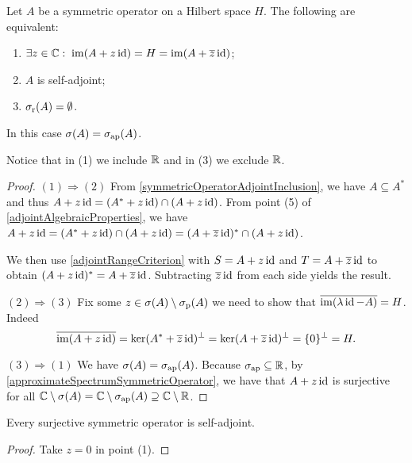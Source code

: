 \begin{proposition} \label{rangeSelfAdjointCriterion}
Let $A$ be a symmetric operator on a Hilbert space $H$. The following are equivalent:
\begin{enumerate}
\item $\exists z \in \mathbb{C}: \; \operatorname{im}(A+z\operatorname{id}) = H = \operatorname{im}(A+\overline{z}\operatorname{id})$;
\item $A$ is self-adjoint;
\item $\sigma_\text{r}(A) = \emptyset$.
\end{enumerate}
In this case $\sigma(A) = \sigma_\text{ap}(A)$.
\end{proposition}
Notice that in (1) we include $\mathbb{R}$ and in (3) we exclude $\mathbb{R}$.
\begin{proof}
$(1) \Rightarrow (2)$ From \ref{symmetricOperatorAdjointInclusion}, we have $A\subseteq A^*$ and thus $A+z\operatorname{id} = (A^* + z\operatorname{id})\cap(A+z\operatorname{id})$. From point (5) of \ref{adjointAlgebraicProperties}, we have $A+z\operatorname{id} = (A^* + z\operatorname{id})\cap(A+z\operatorname{id}) = (A+\overline{z}\operatorname{id})^*\cap (A+z\operatorname{id})$.

We then use \ref{adjointRangeCriterion} with $S = A+z\operatorname{id}$ and $T = A+\overline{z}\operatorname{id}$ to obtain $(A+z\operatorname{id})^* = A+\overline{z}\operatorname{id}$. Subtracting $\overline{z}\operatorname{id}$ from each side yields the result.

$(2) \Rightarrow (3)$ Fix some $z \in \sigma(A) \setminus\sigma_\text{p}(A)$ we need to show that $\overline{\operatorname{im}(\lambda\operatorname{id} - A)} = H$. Indeed
\[ \overline{\operatorname{im}(A+z\operatorname{id})} = \ker(A^* + \overline{z}\operatorname{id})^\perp = \ker(A+\overline{z}\operatorname{id})^\perp = \{0\}^\perp = H. \]

$(3) \Rightarrow (1)$ We have $\sigma(A) = \sigma_\text{ap}(A)$. Because $\sigma_\text{ap}\subseteq \mathbb{R}$, by \ref{approximateSpectrumSymmetricOperator}, we have that $A+z\operatorname{id}$ is surjective for all $\mathbb{C}\setminus\sigma(A) = \mathbb{C}\setminus\sigma_\text{ap}(A) \supseteq \mathbb{C}\setminus\mathbb{R}$.
\end{proof}
\begin{corollary}
Every surjective symmetric operator is self-adjoint.
\end{corollary}
\begin{proof}
Take $z=0$ in point (1).
\end{proof}

